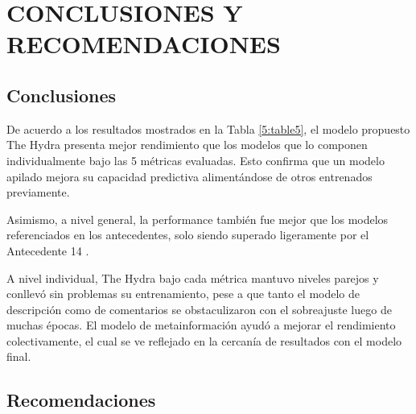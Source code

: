 \chapter{CONCLUSIONES Y RECOMENDACIONES}
\section{Conclusiones}
De acuerdo a los resultados mostrados en la Tabla \ref{5:table5}, el modelo propuesto The Hydra presenta mejor rendimiento que los modelos que lo componen individualmente bajo las 5 métricas evaluadas. Esto confirma que un modelo apilado mejora su capacidad predictiva alimentándose de otros entrenados previamente.

Asimismo, a nivel general, la performance también fue mejor que los modelos referenciados en los antecedentes, solo siendo superado ligeramente por el Antecedente 14 \parencite{pr_cheng2019deeplearning}.

A nivel individual, The Hydra bajo cada métrica mantuvo niveles parejos y conllevó sin problemas su entrenamiento, pese a que tanto el modelo de descripción como de comentarios se obstaculizaron con el sobreajuste luego de muchas épocas. El modelo de metainformación ayudó a mejorar el rendimiento colectivamente, el cual se ve reflejado en la cercanía de resultados con el modelo final.


\section{Recomendaciones}




